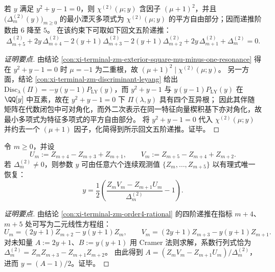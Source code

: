 \begin{conclusion}\label{con:xi-terminal-zm-exterior-square-hankel-wronskian-order5-golden}
若 \(y\) 满足 \(y^2+y-1=0\)，则 \(\chi^{(2)}(\mu;y)\) 含因子 \((\mu+1)^2\)，并且 \(\bigl(\Delta^{(2)}_m(y)\bigr)_{m\ge 0}\) 的最小湮灭多项式为 \(\chi^{(2)}(\mu;y)\) 的平方自由部分；因而递推阶数由 \(6\) 降至 \(5\)。
在该约束下可取如下回文五阶递推：
\[
\boxed{\;
\Delta^{(2)}_{m+5}+2y\,\Delta^{(2)}_{m+4}-2(y+1)\Delta^{(2)}_{m+3}-2(y+1)\Delta^{(2)}_{m+2}+2y\,\Delta^{(2)}_{m+1}+\Delta^{(2)}_{m}=0.
\;}
\]
\end{conclusion}
\begin{proof}[证明要点]
由结论 \ref{con:xi-terminal-zm-exterior-square-mu-minus-one-resonance} 得在 \(y^2+y-1=0\) 时 \(\mu=-1\) 为二重根，故 \((\mu+1)^2\mid \chi^{(2)}(\mu;y)\)。
另一方面，结论 \ref{con:xi-terminal-zm-discriminant-leyang} 给出 \(\mathrm{Disc}_{\lambda}(\Pi)=-y(y-1)P_{\mathrm{LY}}(y)\)，而 \(y^2+y-1\) 与 \(y(y-1)P_{\mathrm{LY}}(y)\) 在 \(\QQ[y]\) 中互素，故在 \(y^2+y-1=0\) 下 \(\Pi(\lambda,y)\) 具有四个互异根；
因此其伴随矩阵在代数闭包中可对角化，而外二次表示在同一特征向量楔积基下亦对角化，故最小多项式为特征多项式的平方自由部分。
将 \(y^2+y-1=0\) 代入 \(\chi^{(2)}(\mu;y)\) 并约去一个 \((\mu+1)\) 因子，化简得到所示回文五阶递推。证毕。
\end{proof}

\begin{conclusion}[任意六窗局部数据的有理可识别性]\label{con:xi-terminal-zm-six-window-rational-identifiability}
令 \(m\ge 0\)，并设
\[
U_m:=Z_{m+4}-Z_{m+3}+Z_{m+1},\qquad
V_m:=Z_{m+5}-Z_{m+4}+Z_{m+2}.
\]
若 \(\Delta^{(2)}_m\neq 0\)，则参数 \(y\) 可由任意六个连续观测值 \(\{Z_m,\dots,Z_{m+5}\}\) 以有理式唯一恢复：
\[
\boxed{\;
y=\frac12\left(\frac{Z_mV_m-Z_{m+1}U_m}{\Delta^{(2)}_m}-1\right).
\;}
\]
\end{conclusion}
\begin{proof}[证明要点]
由结论 \ref{con:xi-terminal-zm-order4-rational} 的四阶递推在指标 \(m+4\)、\(m+5\) 处可写为二元线性方程组：
\[
U_m=(2y+1)Z_{m+2}-y(y+1)Z_m,\qquad
V_m=(2y+1)Z_{m+3}-y(y+1)Z_{m+1}.
\]
对未知量 \(A:=2y+1\)、\(B:=y(y+1)\) 用 Cramer 法则求解，系数行列式恰为
\(\Delta^{(2)}_m=Z_mZ_{m+3}-Z_{m+1}Z_{m+2}\)。
由此得到
\(
A=(Z_mV_m-Z_{m+1}U_m)/\Delta^{(2)}_m
\)，进而 \(y=(A-1)/2\)。证毕。
\end{proof}

